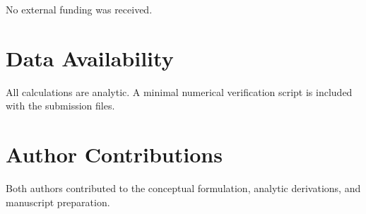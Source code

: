 \documentclass[reprint,aps,pra,superscriptaddress,nofootinbib,longbibliography]{revtex4-2}
\begin{document}
\begin{acknowledgments}
No external funding was received.
\end{acknowledgments}

\section*{Data Availability}
All calculations are analytic.  A minimal numerical verification script is included with the submission files.

\section*{Author Contributions}
Both authors contributed to the conceptual formulation, analytic derivations, and manuscript preparation.
\end{document}
